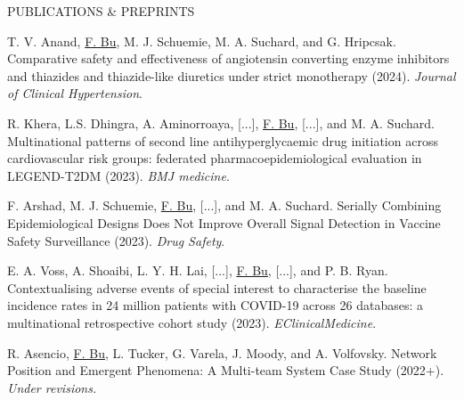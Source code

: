 \documentclass{resume} %
\newcommand{\myName}[1]{\underline{#1}}
\begin{document}
\begin{rSection}{PUBLICATIONS \& PREPRINTS}
\smallskip 

T. V. Anand, \myName{F. Bu}, M. J. Schuemie, M. A. Suchard, and G. Hripcsak. Comparative safety and effectiveness of angiotensin converting enzyme inhibitors and thiazides and thiazide-like diuretics under strict monotherapy (2024).  \emph{Journal of Clinical Hypertension}.

\smallskip 

R. Khera, L.S. Dhingra, A. Aminorroaya, [...], \myName{F. Bu}, [...], and  M. A. Suchard.  Multinational patterns of second line antihyperglycaemic drug initiation across cardiovascular risk groups: federated pharmacoepidemiological evaluation in LEGEND-T2DM (2023). \emph{BMJ medicine}. 

\smallskip

F. Arshad, M. J. Schuemie, \myName{F. Bu}, [...], and M. A. Suchard. Serially Combining Epidemiological Designs Does Not Improve Overall Signal Detection in Vaccine Safety Surveillance (2023). \emph{Drug Safety}. 

\smallskip

E. A. Voss, A. Shoaibi, L. Y. H. Lai,  [...], \myName{F. Bu}, [...], and P. B. Ryan. Contextualising adverse events of special interest to characterise the baseline incidence rates in 24 million patients with COVID-19 across 26 databases: a multinational retrospective cohort study (2023). \emph{EClinicalMedicine}. 


\smallskip

R. Asencio, \myName{F. Bu}, L. Tucker, G. Varela, J. Moody, and A. Volfovsky. 
Network Position and Emergent Phenomena: A Multi-team System Case Study (2022+). \emph{Under revisions.}


\end{rSection}




%

\end{document}
